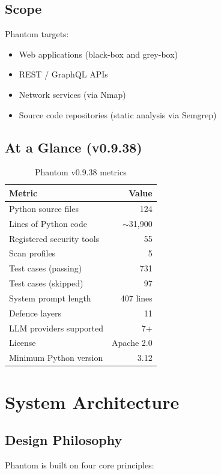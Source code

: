 \documentclass[11pt,a4paper]{article}
\begin{document}
\subsection{Scope}
Phantom targets:
\begin{itemize}[noitemsep]
  \item Web applications (black-box and grey-box)
  \item REST / GraphQL APIs
  \item Network services (via Nmap)
  \item Source code repositories (static analysis via Semgrep)
\end{itemize}

\subsection{At a Glance (v0.9.38)}
\begin{table}[H]
\centering
\caption{Phantom v0.9.38 metrics}
\label{tab:metrics}
\begin{tabular}{lr}
\toprule
\textbf{Metric} & \textbf{Value} \\
\midrule
Python source files           & 124 \\
Lines of Python code          & $\sim$31{,}900 \\
Registered security tools     & 55  \\
Scan profiles                 & 5   \\
Test cases (passing)          & 731 \\
Test cases (skipped)          & 97  \\
System prompt length          & 407 lines \\
Defence layers                & 11 \\
LLM providers supported       & 7+ \\
License                       & Apache 2.0 \\
Minimum Python version        & 3.12 \\
\bottomrule
\end{tabular}
\end{table}


\section{System Architecture}
\label{sec:arch}

\subsection{Design Philosophy}
Phantom is built on four core principles:
\end{document}
